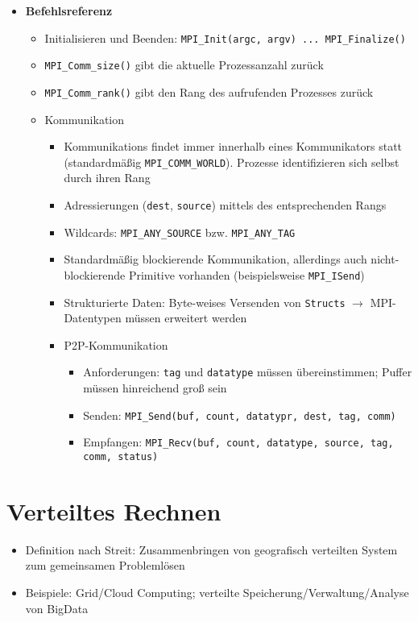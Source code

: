 \begin{itemize}
\begin{itemize}
\begin{itemize}
		\end{itemize}
	\end{itemize}
	\item \textbf{Befehlsreferenz}
	\begin{itemize}
		\item Initialisieren und Beenden: \texttt{MPI\_Init(argc, argv) ... MPI\_Finalize()}
		\item \texttt{MPI\_Comm\_size()} gibt die aktuelle Prozessanzahl zurück
		\item \texttt{MPI\_Comm\_rank()} gibt den Rang des aufrufenden Prozesses zurück
		\item Kommunikation
		\begin{itemize}
			\item Kommunikations findet immer innerhalb eines Kommunikators statt (standardmäßig \texttt{MPI\_COMM\_WORLD}). Prozesse identifizieren sich selbst durch ihren Rang
			\item Adressierungen (\texttt{dest}, \texttt{source}) mittels des entsprechenden Rangs
			\item Wildcards: \texttt{MPI\_ANY\_SOURCE} bzw. \texttt{MPI\_ANY\_TAG}
			\item Standardmäßig blockierende Kommunikation, allerdings auch nicht-blockierende Primitive vorhanden (beispielsweise \texttt{MPI\_ISend})
			\item Strukturierte Daten: Byte-weises Versenden von \texttt{Structs} \(\rightarrow\) MPI-Datentypen müssen erweitert werden
			\item P2P-Kommunikation
			\begin{itemize}
				\item Anforderungen: \texttt{tag} und \texttt{datatype} müssen übereinstimmen; Puffer müssen hinreichend groß sein
				\item Senden: \texttt{MPI\_Send(buf, count, datatypr, dest, tag, comm)}
				\item Empfangen: \texttt{MPI\_Recv(buf, count, datatype, source, tag, comm, status)}
			\end{itemize}
		\end{itemize}
	\end{itemize}
\end{itemize}



\section{Verteiltes Rechnen}
\begin{itemize}
	\item Definition nach Streit: Zusammenbringen von geografisch verteilten System zum gemeinsamen Problemlösen
	\item Beispiele: Grid/Cloud Computing; verteilte Speicherung/Verwaltung/Analyse von BigData
\end{itemize}


